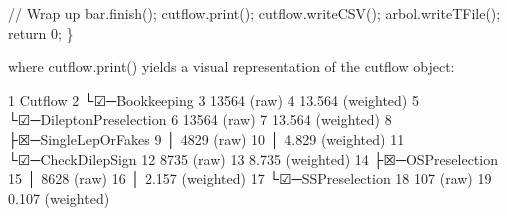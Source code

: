 \begin{DoxyEnumerate}
\begin{DoxyCode}
    \textcolor{comment}{// Wrap up}
    bar.finish();
    cutflow.print();
    cutflow.writeCSV();
    arbol.writeTFile();
    \textcolor{keywordflow}{return} 0;
\}
\end{DoxyCode}

\end{DoxyEnumerate}

where {\ttfamily cutflow.\+print()} yields a visual representation of the cutflow object\+: 
\begin{DoxyCode}
1 Cutflow
2 └☑─Bookkeeping
3     13564 (raw)
4     13.564 (weighted)
5     └☑─DileptonPreselection
6         13564 (raw)
7         13.564 (weighted)
8         ├☒─SingleLepOrFakes
9         │   4829 (raw)
10         │   4.829 (weighted)
11         └☑─CheckDilepSign
12             8735 (raw)
13             8.735 (weighted)
14             ├☒─OSPreselection
15             │   8628 (raw)
16             │   2.157 (weighted)
17             └☑─SSPreselection
18                 107 (raw)
19                 0.107 (weighted)
\end{DoxyCode}
 